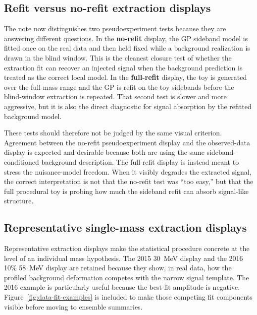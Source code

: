 \subsection{Refit versus no-refit extraction displays}

The note now distinguishes two pseudoexperiment tests because they are answering
different questions. In the \textbf{no-refit} display, the GP sideband model
is fitted once on the real data and then held fixed while a background realization is
drawn in the blind window. This is the cleanest closure test of whether the extraction
fit can recover an injected signal when the background prediction is treated as the
correct local model. In the \textbf{full-refit} display, the toy is generated over the
full mass range and the GP is refit on the toy sidebands before the blind-window
extraction is repeated. That second test is slower and more aggressive, but it is also
the direct diagnostic for signal absorption by the refitted background model.

These tests should therefore not be judged by the same visual criterion. Agreement
between the no-refit pseudoexperiment display and the observed-data display is expected
and desirable because both are using the same sideband-conditioned background
description. The full-refit display is instead meant to stress the nuisance-model
freedom. When it visibly degrades the extracted signal, the correct interpretation is
not that the no-refit test was ``too easy,'' but that the full procedural toy is
probing how much the sideband refit can absorb signal-like structure.

\subsection{Representative single-mass extraction displays}

Representative extraction displays make the statistical procedure concrete at the level
of an individual mass hypothesis. The 2015 \SI{30}{MeV} display and the 2016 10\%
\SI{58}{MeV} display are retained because they show, in real data, how the profiled
background deformation competes with the narrow signal template. The 2016 example is
particularly useful because the best-fit amplitude is negative.
Figure~\ref{fig:data-fit-examples} is included to make those competing fit components
visible before moving to ensemble summaries.

